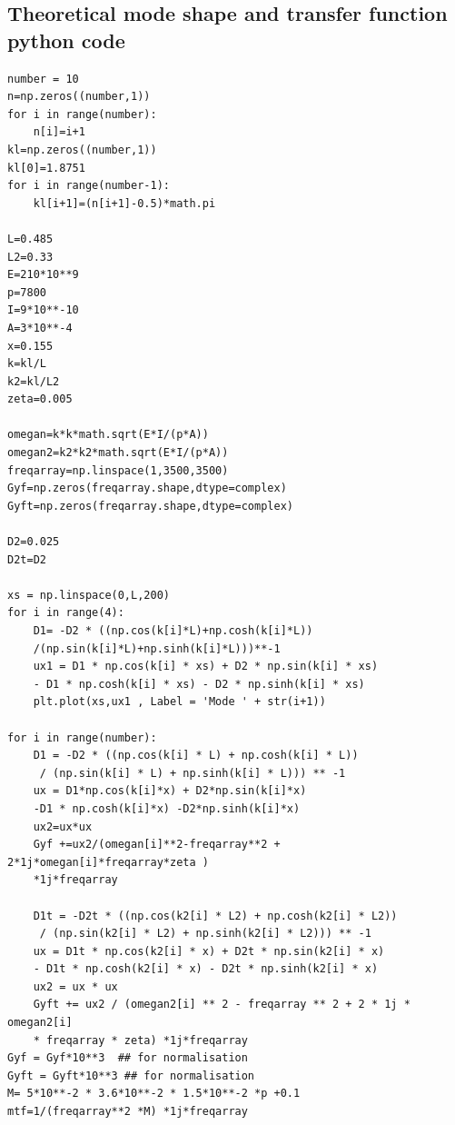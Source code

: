 \documentclass[twoside,onecolumn]{article}
\begin{document}
\subsection{Theoretical mode shape and transfer function python code}
\begin{lstlisting}
number = 10
n=np.zeros((number,1))
for i in range(number):
    n[i]=i+1
kl=np.zeros((number,1))
kl[0]=1.8751
for i in range(number-1):
    kl[i+1]=(n[i+1]-0.5)*math.pi

L=0.485
L2=0.33
E=210*10**9
p=7800
I=9*10**-10
A=3*10**-4
x=0.155
k=kl/L
k2=kl/L2
zeta=0.005

omegan=k*k*math.sqrt(E*I/(p*A))
omegan2=k2*k2*math.sqrt(E*I/(p*A))
freqarray=np.linspace(1,3500,3500)
Gyf=np.zeros(freqarray.shape,dtype=complex)
Gyft=np.zeros(freqarray.shape,dtype=complex)

D2=0.025
D2t=D2

xs = np.linspace(0,L,200)
for i in range(4):
    D1= -D2 * ((np.cos(k[i]*L)+np.cosh(k[i]*L))
    /(np.sin(k[i]*L)+np.sinh(k[i]*L)))**-1
    ux1 = D1 * np.cos(k[i] * xs) + D2 * np.sin(k[i] * xs) 
    - D1 * np.cosh(k[i] * xs) - D2 * np.sinh(k[i] * xs)
    plt.plot(xs,ux1 , Label = 'Mode ' + str(i+1))

for i in range(number):
    D1 = -D2 * ((np.cos(k[i] * L) + np.cosh(k[i] * L))
     / (np.sin(k[i] * L) + np.sinh(k[i] * L))) ** -1
    ux = D1*np.cos(k[i]*x) + D2*np.sin(k[i]*x) 
    -D1 * np.cosh(k[i]*x) -D2*np.sinh(k[i]*x)
    ux2=ux*ux
    Gyf +=ux2/(omegan[i]**2-freqarray**2 + 2*1j*omegan[i]*freqarray*zeta ) 
    *1j*freqarray

    D1t = -D2t * ((np.cos(k2[i] * L2) + np.cosh(k2[i] * L2))
     / (np.sin(k2[i] * L2) + np.sinh(k2[i] * L2))) ** -1
    ux = D1t * np.cos(k2[i] * x) + D2t * np.sin(k2[i] * x) 
    - D1t * np.cosh(k2[i] * x) - D2t * np.sinh(k2[i] * x)
    ux2 = ux * ux
    Gyft += ux2 / (omegan2[i] ** 2 - freqarray ** 2 + 2 * 1j * omegan2[i] 
    * freqarray * zeta) *1j*freqarray
Gyf = Gyf*10**3  ## for normalisation
Gyft = Gyft*10**3 ## for normalisation
M= 5*10**-2 * 3.6*10**-2 * 1.5*10**-2 *p +0.1
mtf=1/(freqarray**2 *M) *1j*freqarray
\end{lstlisting}
\end{document}
